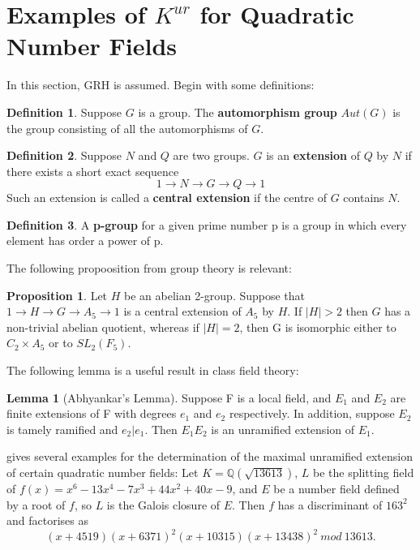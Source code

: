 \documentclass[12pt]{extarticle}
\newcommand{\Q}{\mathbb{Q}}
\newcommand{\<}{\langle}
\renewcommand{\>}{\rangle}
\theoremstyle{definition}
\newtheorem*{definition}{Definition}
\newtheorem{proposition}{Proposition}
\newtheorem{lemma}{Lemma}
\begin{document}
\section{Examples of $K^{ur}$ for Quadratic Number Fields}
In this section, GRH is assumed. 
Begin with some definitions:
\begin{definition}
Suppose $G$ is a group. The \textbf{automorphism group} $Aut(G)$ is the group consisting of all the automorphisms of $G$. 

\end{definition}

\begin{definition}
Suppose $N$ and $Q$ are two groups. $G$ is an \textbf{extension} of $Q$ by $N$ if there exists a short exact sequence 
\begin{equation}
1 \rightarrow N \rightarrow G \rightarrow Q \rightarrow 1 
\end{equation}
Such an extension is called a \textbf{central extension} if the centre of $G$ contains $N$. 
\end{definition}
\begin{definition}
A \textbf{p-group} for a given prime number p is a group in which every element has order a power of p.
\end{definition}
The following propoosition from group theory is relevant:
\begin{proposition}
Let $H$ be an abelian 2-group. Suppose that $1 \rightarrow H \rightarrow G \rightarrow A_5 \rightarrow 1$ is a central extension of $A_5$ by $H$. If $|H| > 2$ then $G$ has a non-trivial abelian quotient, whereas if $|H|=2$, then G is isomorphic either to $C_2 \times A_5$ or to $SL_2(F_5)$.
\end{proposition}
The following lemma is a useful result in class field theory:
\begin{lemma}[Abhyankar's Lemma]
    Suppose F is a local field, and $E_1$ and $E_2$ are finite extensions of F with degrees $e_1$ and $e_2$ respectively. In addition, suppose $E_2$ is tamely ramified and $e_2|e_1$. Then $E_1E_2$ is an unramified extension of $E_1$.
 \end{lemma}
 \cite{KIM2017} gives several examples for the determination of the maximal unramified extension of certain quadratic number fields: 
Let $K= \Q(\sqrt{13613})$,  $L$ be the splitting field of $f(x)=x^6-13x^4-7x^3 +44x^2 +40x-9$, and $E$ be a number field defined by a root of $f$, so $L$ is the Galois closure of $E$. Then $f$ has a discriminant of $163^2$ and factorises as
\begin{equation}
(x+4519)(x+6371)^2(x+10315)(x+13438)^2 \: mod \: 13613.
\end{equation}
\end{document}
